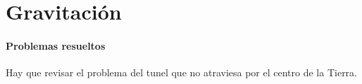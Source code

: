 \documentclass[/home/hernan-barquero/Documents/Apuntes_mecanica_teorica/main.tex]{subfiles}
\begin{document}
    \part{Gravitación}

    \subsection{Problemas resueltos}
    Hay que revisar el problema del tunel que no atraviesa por el centro de la Tierra.
    
\end{document}

